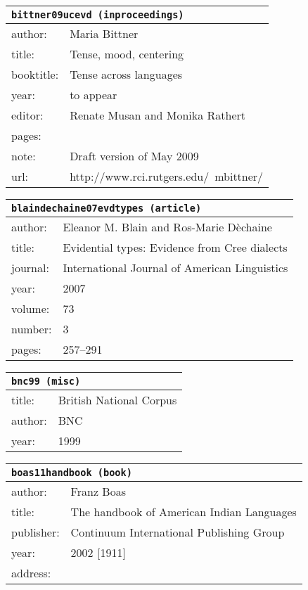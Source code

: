 \documentclass{article}
\begin{document}
\bigskip

\begin{tabular}{p{}p{}}
\multicolumn{2}{l}{\texttt{bittner09ucevd (inproceedings)}}\\
\hline
author: & Maria Bittner\\
title: & Tense, mood, centering\\
booktitle: & Tense across languages\\
year: & to appear\\
editor: & Renate Musan and Monika Rathert\\
pages: & \\
note: & Draft version of May 2009\\
url: & http://www.rci.rutgers.edu/~mbittner/\\
\end{tabular}

\bigskip

\begin{tabular}{p{}p{}}
\multicolumn{2}{l}{\texttt{blaindechaine07evdtypes (article)}}\\
\hline
author: & Eleanor M. Blain and Ros-Marie D{\`e}chaine\\
title: & Evidential types: Evidence from \textsc{C}ree dialects\\
journal: & International Journal of American Linguistics\\
year: & 2007\\
volume: & 73\\
number: & 3\\
pages: & 257--291\\
\end{tabular}

\bigskip

\begin{tabular}{p{}p{}}
\multicolumn{2}{l}{\texttt{bnc99 (misc)}}\\
\hline
title: & British \textsc{N}ational \textsc{C}orpus\\
author: & BNC\\
year: & 1999\\
\end{tabular}

\bigskip

\begin{tabular}{p{}p{}}
\multicolumn{2}{l}{\texttt{boas11handbook (book)}}\\
\hline
author: & Franz Boas\\
title: & The handbook of \textsc{A}merican Indian Languages\\
publisher: & Continuum International Publishing Group\\
year: & 2002 [1911]\\
address: & \\
\end{tabular}
\end{document}
